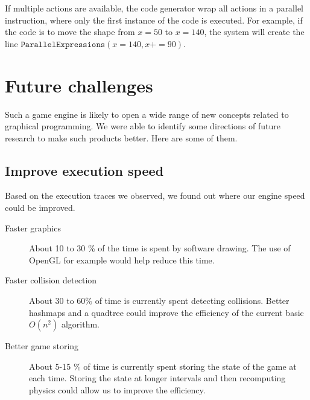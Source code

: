 \documentclass[12pt]{article} %
\begin{document}
If multiple actions are available, the code generator wrap all actions in a
parallel instruction, where only the first instance of the code is executed.
For example, if the code is to move the shape from $x = 50$ to $x = 140$, the
system will create the line $\texttt{ParallelExpressions}(x = 140, x += 90)$.


\section{Future challenges}
Such a game engine is likely to open a wide range of new concepts
related to graphical programming. We were able to identify some directions of
future research to make such products better. Here are some of them.

\subsection{Improve execution speed}
Based on the execution traces we observed, we found out where our engine speed
could be improved.
\begin{description}
\item[Faster graphics] About 10 to 30 \% of the time is spent by software
drawing.
The use of OpenGL for example would help reduce this time.
\item[Faster collision detection] About 30 to 60\% of time is currently spent
detecting collisions. Better hashmaps and a quadtree could improve the
efficiency of the current basic $O(n^2)$ algorithm.
\item[Better game storing] About 5-15 \% of time is currently spent
storing the state of the game at each time. Storing the state at longer
intervals and then recomputing physics could allow us to improve the efficiency.
\end{description}
\end{document}
